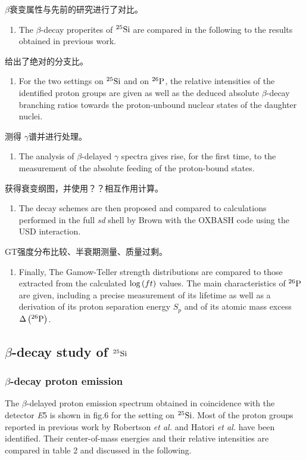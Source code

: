 \documentclass[UTF8]{ctexart}
\begin{document}
$\beta$衰变属性与先前的研究进行了对比。
\begin{enumerate}
    \item The $\beta$-decay properites of $^{25}\textnormal{Si}$ are compared in the following to the results obtained in previous work.
\end{enumerate}
给出了绝对的分支比。
\begin{enumerate}
    \item For the two settings on $^{25}\textnormal{Si}$ and on $^{26}\textnormal{P}$, the relative intensities of the identified proton groups are given as well as the deduced absolute $\beta$-decay branching ratios towards the proton-unbound nuclear states of the daughter nuclei.
\end{enumerate}
测得 $\gamma$谱并进行处理。
\begin{enumerate}
    \item The analysis of $\beta$-delayed $\gamma$ spectra gives rise, for the first time, to the measurement of the absolute feeding of the proton-bound states.
\end{enumerate}
获得衰变纲图，并使用？？相互作用计算。
\begin{enumerate}
    \item The decay schemes are then proposed and compared to calculations performed in the full \textit{sd} shell by Brown with the OXBASH code using the USD interaction.
\end{enumerate}
GT强度分布比较、半衰期测量、质量过剩。
\begin{enumerate}
    \item  Finally, The Gamow-Teller strength distributions are compared to those extracted from the calculated $\textnormal{log}\left( ft \right)$ values. The main characteristics of $^{26}\textnormal{P}$ are given, including a precise measurement of its lifetime as well as a derivation of its proton separation energy $S_{p}$ and of its atomic mass excess $\Delta \left( ^{26}\textnormal{P} \right)$.

\end{enumerate}

\subsection{$\beta$-decay study of $^{25}\textnormal{Si}$}
\subsubsection{$\beta$-decay proton emission}
The $\beta$-delayed proton emission spectrum obtained in coincidence with the detector \textit{E}5 is shown in fig.6 for the setting on $^{25}\textnormal{Si}$. Most of the proton groups reported in previous work by Robertson \textit{et al.} and Hatori \textit{et al.} have been identified. Their center-of-mass energies and their relative intensities are compared in table 2 and discussed in the following.
\end{document}
